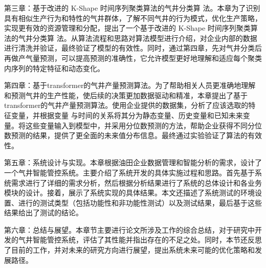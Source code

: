 第三章：基于改进的 K-Shape 时间序列聚类算法的气井分类算
法。本章为了识别具有相似生产行为和特性的气井群体，了解不同气井的行为模式，优化生产策略，实现更有效的资源管理和分配，提出了一个基于改进的 K-Shape 时间序列聚类算法的气井分类算
法。从算法流程和思路对算法模型进行介绍，对企业内部的数据进行清洗并验证，最终验证了模型的有效性。同时，通过第四章，先对气井分类后再做产气量预测，可以提高预测的准确性，它允许模型更好地理解和适应每个聚类内序列的特定特征和动态变化。

第四章：基于transformer的气井产量预测算法。为了帮助相关人员更准确地理解和预测气井的生产性能，使后续的决策更加数据驱动和精准，本章提出了基于transformer的气井产量预测算法。使用企业提供的数据集，分析了应该选取的特征变量，并根据变量
与时间的关系将其分为静态变量、历史变量和已知未来变量。将这些变量输入到模型中，并采用分位数预测的方法，帮助企业获得不同分位数预测的结果，提供了更全面的未来值分布信息。最终通过实验验证了算法的有效性。

第五章：系统设计与实现。本章根据油田企业数据管理和智能分析的需求，设计了一个气井智能管控系统。主要介绍了系统开发的具体实施过程和思路。首先基于系统需求进行了详细的需求分析，然后根据分析结果进行了系统的总体设计和各业务模块的设计。接着，展示了系统实现的具体结果。本文还描述了系统测试的环境设置、进行的测试类型（包括功能性和非功能性测试）以及测试结果，最后基于这些结果给出了测试的结论。

第六章：总结与展望。本章节主要进行论文所涉及工作的综合总结，对于研究中开发的气井智能管控系统，评估了其性能并指出存在的不足之处。同时，本节还反思了目前的工作，并对未来的研究方向进行展望，提出系统未来可能的优化策略和发展路径。